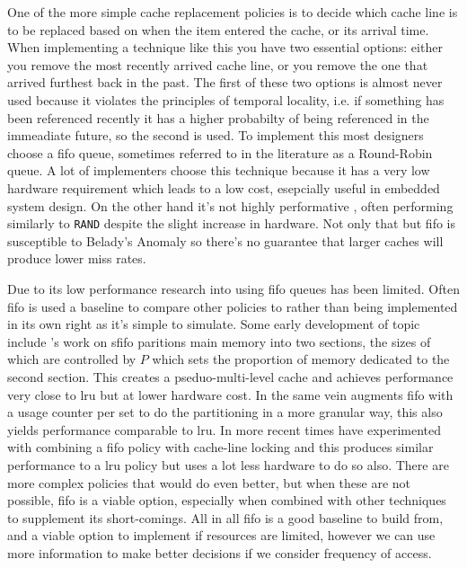 One of the more simple cache replacement policies is to decide which cache line is to be replaced based on when the item entered the cache, or its arrival time. When implementing a technique like this you have two essential options: either you remove the most recently arrived cache line, or you remove the one that arrived furthest back in the past. The first of these two options is almost never used because it violates the principles of temporal locality, i.e. if something has been referenced recently it has a higher probabilty of being referenced in the immeadiate future, so the second is used. To implement this most designers choose a \gls{fifo} queue, sometimes referred to in the literature as a Round-Robin queue. A lot of implementers choose this technique because it has a very low hardware requirement \cite{pandaSurveyReplacementStrategies2016} which leads to a low cost, esepcially useful in embedded system design. On the other hand it's not highly performative \cite{al-zoubiPerformanceEvaluationCache2004, tsaoMultiFactorPagingExperiment1972}, often performing similarly to \texttt{RAND} despite the slight increase in hardware. Not only that but \gls{fifo} is susceptible to Belady's Anomaly \cite{beladyAnomalySpacetimeCharacteristics1969} so there's no guarantee that larger caches will produce lower miss rates. 

Due to its low performance research into using \gls{fifo} queues has been limited. Often \gls{fifo} is used a baseline to compare other policies to \cite{faresPerformanceEvaluationTraditional2012} rather than being implemented in its own right as it's simple to simulate. Some early development of topic include \citet{turnerSegmentedFIFOPage1981}'s work on \gls{sfifo} paritions main memory into two sections, the sizes of which are controlled by $P$ which sets the proportion of memory dedicated to the second section. This creates a pseduo-multi-level cache and achieves performance very close to \gls{lru} but at lower hardware cost. In the same vein \citet{devilleLowcostUsagebasedReplacement1990} augments \gls{fifo} with a usage counter per set to do the partitioning in a more granular way, this also yields performance comparable to \gls{lru}. In more recent times \citet{wei-chetsengPRRLowoverheadCache2012} have experimented with combining a \gls{fifo} policy with cache-line locking and this produces similar performance to a \gls{lru} policy but uses a lot less hardware to do so also. There are more complex policies that would do even better, but when these are not possible, \gls{fifo} is a viable option, especially when combined with other techniques to supplement its short-comings. All in all \gls{fifo} is a good baseline to build from, and a viable option to implement if resources are limited, however we can use more information to make better decisions if we consider frequency of access. 

